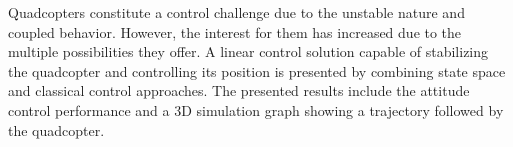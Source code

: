 
Quadcopters constitute a control challenge due to the unstable nature and coupled behavior. However, the interest for them has increased due to the multiple possibilities they offer. A linear control solution capable of stabilizing the quadcopter and controlling its position is presented by combining state space and classical control approaches. The presented results include the attitude control performance and a 3D simulation graph showing a trajectory followed by the quadcopter.